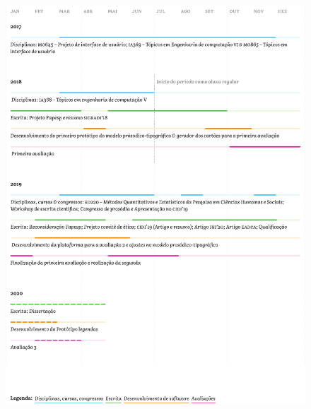 \documentclass[a4paper]{tufte-handout}
\begin{document}
\begin{figure}[!htb]
  \includegraphics[width=.95\linewidth]{imgs/cronograma.pdf}
  \label{fig:cronograma}
\end{figure}

\pagebreak



\renewcommand{\refname}{Bibliografia}
\makeatletter
\renewcommand{\bibsection}{%
   \section{\refname%
            \@mkboth{\MakeUppercase{\refname}}{\MakeUppercase{\refname}}%
   }
}
\makeatother




%
%
\end{document}
